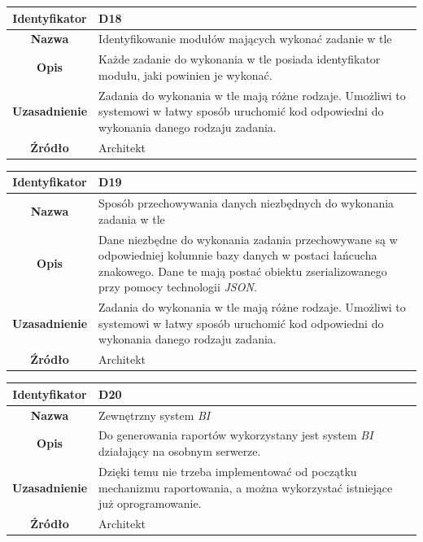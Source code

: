 \begin{table}[H]
\centering
\begin{tabular}{ | >{\bfseries}c | p{11cm} | }
\hline
%
Identyfikator & D18 \\ \hline
Nazwa & Identyfikowanie modułów mających wykonać zadanie w tle \\ \hline
Opis &  	Każde zadanie do wykonania w tle posiada identyfikator modułu, jaki powinien je wykonać. \\ \hline
Uzasadnienie & Zadania do wykonania w tle mają różne rodzaje. Umożliwi to systemowi w łatwy sposób uruchomić kod odpowiedni do wykonania danego rodzaju zadania. \\ \hline
Źródło & Architekt \\ \hline
%
\end{tabular}
\end{table}

\begin{table}[H]
\centering
\begin{tabular}{ | >{\bfseries}c | p{11cm} | }
\hline
%
Identyfikator & D19 \\ \hline
Nazwa &  Sposób przechowywania danych niezbędnych do wykonania zadania w tle \\ \hline
Opis & Dane niezbędne do wykonania zadania przechowywane są w odpowiedniej kolumnie bazy danych w postaci łańcucha znakowego. Dane te mają postać obiektu zserializowanego przy pomocy technologii \textit{JSON}. \\ \hline
Uzasadnienie & Zadania do wykonania w tle mają różne rodzaje. Umożliwi to systemowi w łatwy sposób uruchomić kod odpowiedni do wykonania danego rodzaju zadania. \\ \hline
Źródło & Architekt \\ \hline
%
\end{tabular}
\end{table}

\begin{table}[H]
\centering
\begin{tabular}{ | >{\bfseries}c | p{11cm} | }
\hline
%
Identyfikator & D20 \\ \hline
Nazwa & Zewnętrzny system \textit{BI} \\ \hline
Opis & Do generowania raportów wykorzystany jest system \textit{BI} działający na osobnym serwerze. \\ \hline
Uzasadnienie & Dzięki temu nie trzeba implementować od początku mechanizmu raportowania, a można wykorzystać istniejące już oprogramowanie.  \\ \hline
Źródło & Architekt \\ \hline
%
\end{tabular}
\end{table}

